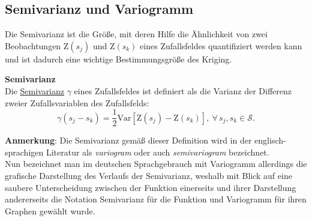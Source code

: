 \subsection{Semivarianz und Variogramm}
\label{KapitelTheorieVariogramm}

Die Semivarianz ist die Größe, mit deren Hilfe die Ähnlichkeit
von zwei Beobachtungen $\mathrm{Z}(s_j)$ und $\mathrm{Z}(s_k)$
eines Zufallsfeldes quantifiziert werden kann und ist dadurch eine wichtige Bestimmungsgröße des Kriging.

\begin{definition} \textbf{Semivarianz} \\
Die \underline{Semivarianz} $\gamma$ eines Zufallsfeldes ist
definiert als die Varianz der Differenz zweier Zufallsvariablen
des Zufallsfelds:
\begin{equation}
\label{Gl_Semivarianz}
\gamma(s_j - s_k) = \frac{1}{2}\mathrm{Var} \left[ \mathrm{Z}(s_j) 
- \mathrm{Z}(s_k)  \right],\ \forall\,s_j,s_k \in \mathcal{S}.
\end{equation}
\end{definition}
\textbf{Anmerkung}: Die Semivarianz gemäß dieser Definition wird 
in der englisch-sprachigen Literatur als \textit{variogram} oder 
auch \textit{semivariogram} bezeichnet. \\
Nun bezeichnet man im deutschen Sprachgebrauch mit 
Variogramm allerdings die grafische Darstellung des Verlaufs 
der Semivarianz, weshalb mit Blick auf eine saubere
Unterscheidung zwischen der Funktion einerseits
und ihrer Darstellung andererseits die Notation Semivarianz für 
die Funktion und Variogramm für ihren Graphen gewählt wurde.\\

